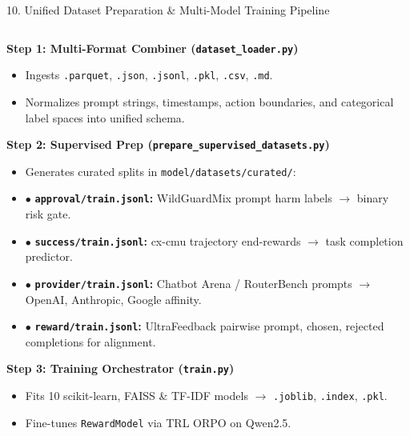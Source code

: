 \documentclass[aspectratio=169,10pt]{beamer}
\begin{document}
\begin{frame}[t]{10. Unified Dataset Preparation \& Multi-Model Training Pipeline}
\begin{columns}[T]
\begin{column}{0.34\textwidth}
  \begin{tcolorbox}[
    enhanced, arc=3pt, colframe=prismTeal!90!black, colback=white,
    title={\scriptsize\bfseries\faCogs\ 2. Ingestion \& Curated Extraction},
    boxrule=0.55pt, left=2.8pt, right=2.8pt, top=1.8pt, bottom=1.8pt
  ]
  \fontsize{4.6}{5.5}\selectfont
  \textbf{Step 1: Multi-Format Combiner (\texttt{dataset\_loader.py})}
  \begin{itemize}\setlength{\itemsep}{0.7pt}
    \item Ingests \texttt{.parquet}, \texttt{.json}, \texttt{.jsonl}, \texttt{.pkl}, \texttt{.csv}, \texttt{.md}.
    \item Normalizes prompt strings, timestamps, action boundaries, and categorical label spaces into unified schema.
  \end{itemize}
  \vspace{1.2pt}
  \textbf{Step 2: Supervised Prep (\texttt{prepare\_supervised\_datasets.py})}
  \begin{itemize}\setlength{\itemsep}{0.7pt}
    \item Generates curated splits in \texttt{model/datasets/curated/}:
    \item $\bullet$ \textbf{\texttt{approval/train.jsonl}:} WildGuardMix prompt harm labels $\to$ binary risk gate.
    \item $\bullet$ \textbf{\texttt{success/train.jsonl}:} cx-cmu trajectory end-rewards $\to$ task completion predictor.
    \item $\bullet$ \textbf{\texttt{provider/train.jsonl}:} Chatbot Arena / RouterBench prompts $\to$ OpenAI, Anthropic, Google affinity.
    \item $\bullet$ \textbf{\texttt{reward/train.jsonl}:} UltraFeedback pairwise prompt, chosen, rejected completions for alignment.
  \end{itemize}
  \vspace{1.2pt}
  \textbf{Step 3: Training Orchestrator (\texttt{train.py})}
  \begin{itemize}\setlength{\itemsep}{0.7pt}
    \item Fits 10 scikit-learn, FAISS \& TF-IDF models $\to$ \texttt{.joblib}, \texttt{.index}, \texttt{.pkl}.
    \item Fine-tunes \texttt{RewardModel} via TRL ORPO on Qwen2.5.
  \end{itemize}
  \end{tcolorbox}
\end{column}


\end{columns}
\end{frame}
\end{document}
